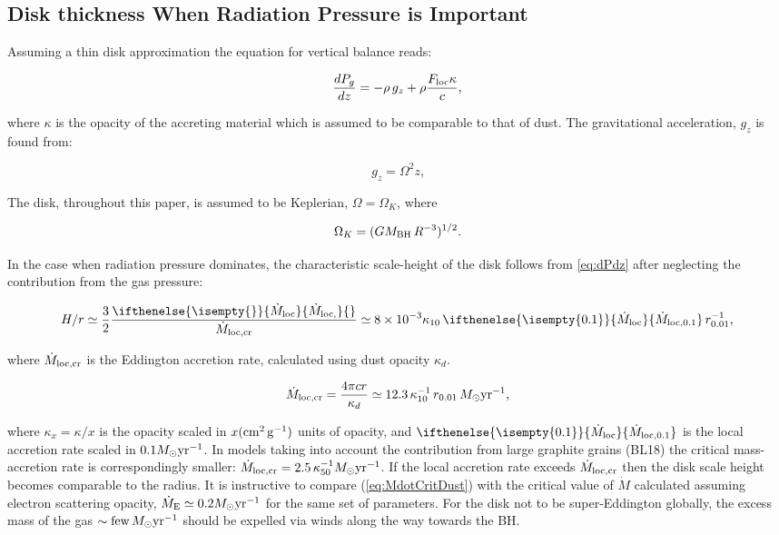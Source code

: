 \documentclass[12pt,english,preprint]{aastex}
\newcommand{\su}[2]{#1_{\rm #2}}
\newcommand{\mdt}[1][]{ 
  \ifthenelse{\isempty{#1}}
  {\dot{M}_{\rm loc}}
  { {\dot M}_{\rm{loc},{#1}} } 
  } %
\newcommand{\mdtcr}{\su{\dot{M}}{loc,cr} }
\newcommand{\MsolYrM}{ \,M_{\odot}{\rm yr}^{-1} }
\begin{document}
\subsection{Disk thickness When Radiation Pressure is Important}

Assuming a thin disk
approximation the equation for vertical balance reads:

\begin{equation}
\frac{dP_g}{dz}=-\rho\,g_{z} + \rho\frac{\su{F}{loc}\kappa}{c}\mbox{,}\label{eq:dPdz}
\end{equation}

\noindent where $\kappa$ is the opacity of the accreting material which
is assumed to be comparable to that of dust.  The gravitational 
acceleration, $g_{z}$ is found from:

\begin{equation}
g_{z}=\Omega^{2}z\mbox{,}\label{eq:gz}
\end{equation}

\noindent The disk, throughout this paper, is assumed to be Keplerian, $\Omega=\Omega_{K}$, where

\begin{equation}
\Omega_{K}=(G\su{M}{BH}\,R^{-3})^{1/2}\mbox{.}\label{eq:OmegaKepler}
\end{equation}


In the case when  
radiation pressure dominates, the characteristic scale-height of the disk follows from \eqref{eq:dPdz} after neglecting the contribution from the gas
pressure: 

\begin{equation}
H/r\simeq\frac{3}{2}\frac{\mdt{}}{\mdtcr}
\simeq8\times10^{-3}\kappa_{10}\,\mdt[0.1]\,r_{0.01}^{-1}\mbox{,}\label{eq:H2R_rad}
\end{equation}

\noindent where $\mdtcr$ is the Eddington accretion rate, calculated using 
dust opacity $\kappa_{d}$. 

\begin{equation}
\mdtcr=\frac{4\pi cr}{\kappa_{d}}\simeq12.3\,\kappa_{10}^{-1}
\,r_{0.01}\,M_{\odot}{\rm yr}^{-1}\mbox{,}\label{eq:MdotCritDust}
\end{equation}

\noindent where $\kappa_x=\kappa/x$ is the opacity scaled in $x({\rm cm^2\,g^{-1}})$ units of opacity, 
and $\mdt[0.1]$ is the local accretion rate scaled
in $0.1 M_{\odot}{\rm yr}^{-1}$. In 
models taking into account the contribution from large graphite grains (BL18) 
the critical mass-accretion rate is correspondingly smaller:
$\mdtcr = 2.5\,\kappa_{50}^{-1} M_{\odot}{\rm yr}^{-1}$. If the local accretion rate exceeds $\mdtcr$ then the disk scale height becomes comparable to the radius.
It is instructive to compare (\ref{eq:MdotCritDust})
with the critical value of $\dot{M}$ calculated assuming electron scattering
opacity, $\dot{M}_{\text{E}}\simeq 0.2M_{\odot}{\rm yr}^{-1}$ for the same set of 
parameters. For the disk not to be super-Eddington globally, the excess mass of the
gas $\sim {\rm few}\MsolYrM$ should be expelled via winds along the way towards the BH.
\end{document}
